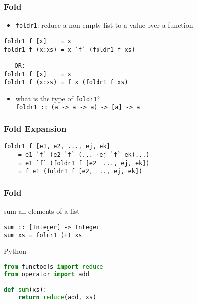 \documentclass[dvipsnames]{beamer}
\theoremstyle{plain}
\begin{document}
\begin{frame}[fragile]
  \frametitle{Fold}

  \begin{itemize}
    \item \lstinline|foldr1|: reduce a non-empty list to a value over a function
  \end{itemize}

  \begin{exampleblock}{}
    \begin{lstlisting}[deletekeywords={foldr1}]
foldr1 f [x]    = x
foldr1 f (x:xs) = x `f` (foldr1 f xs)

-- OR:
foldr1 f [x]    = x
foldr1 f (x:xs) = f x (foldr1 f xs)
    \end{lstlisting}
  \end{exampleblock}

  \pause
  \begin{itemize}
    \item what is the type of \lstinline|foldr1|?\\
      \lstinline|foldr1 :: (a -> a -> a) -> [a] -> a|
  \end{itemize}
\end{frame}

\begin{frame}[fragile]
  \frametitle{Fold Expansion}

  \begin{block}{}
    \begin{lstlisting}
foldr1 f [e1, e2, ..., ej, ek]
    = e1 `f` (e2 `f` (... (ej `f` ek)...)
    = e1 `f` (foldr1 f [e2, ..., ej, ek])
    = f e1 (foldr1 f [e2, ..., ej, ek])
    \end{lstlisting}
  \end{block}
\end{frame}

\begin{frame}[fragile]
  \frametitle{Fold}

  \begin{exampleblock}{sum all elements of a list}
    \begin{lstlisting}[deletekeywords={sum}]
sum :: [Integer] -> Integer
sum xs = foldr1 (+) xs
    \end{lstlisting}
  \end{exampleblock}

  \bigskip
  \begin{exampleblock}{Python}
    \begin{lstlisting}[language=Python, deletekeywords={reduce, sum}]
from functools import reduce
from operator import add

def sum(xs):
    return reduce(add, xs)
    \end{lstlisting}
  \end{exampleblock}
\end{frame}
\end{document}

